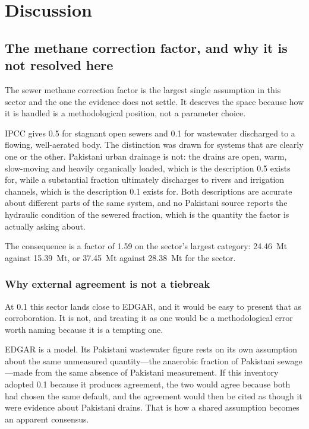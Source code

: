\section{Discussion}
\label{sec:discussion}

\subsection{The methane correction factor, and why it is not resolved here}

The sewer methane correction factor is the largest single assumption in this sector and the
one the evidence does not settle. It deserves the space because how it is handled is a
methodological position, not a parameter choice.

IPCC gives \num{0.5} for stagnant open sewers and \num{0.1} for wastewater discharged to a
flowing, well-aerated body. The distinction was drawn for systems that are clearly one or the
other. Pakistani urban drainage is not: the drains are open, warm, slow-moving and heavily
organically loaded, which is the description \num{0.5} exists for, while a substantial
fraction ultimately discharges to rivers and irrigation channels, which is the description
\num{0.1} exists for. Both descriptions are accurate about different parts of the same system,
and no Pakistani source reports the hydraulic condition of the sewered fraction, which is the
quantity the factor is actually asking about.

The consequence is a factor of \num{1.59} on the sector's largest category:
\SI{24.46}{\mega\tonne} against \SI{15.39}{\mega\tonne}, or \SI{37.45}{\mega\tonne} against
\SI{28.38}{\mega\tonne} for the sector.

\subsubsection{Why external agreement is not a tiebreak}

At \num{0.1} this sector lands close to EDGAR, and it would be easy to present that as
corroboration. It is not, and treating it as one would be a methodological error worth naming
because it is a tempting one.

EDGAR is a model. Its Pakistani wastewater figure rests on its own assumption about the same
unmeasured quantity---the anaerobic fraction of Pakistani sewage---made from the same absence
of Pakistani measurement. If this inventory adopted \num{0.1} because it produces agreement,
the two would agree because both had chosen the same default, and the agreement would then be
cited as though it were evidence about Pakistani drains. That is how a shared assumption
becomes an apparent consensus.

